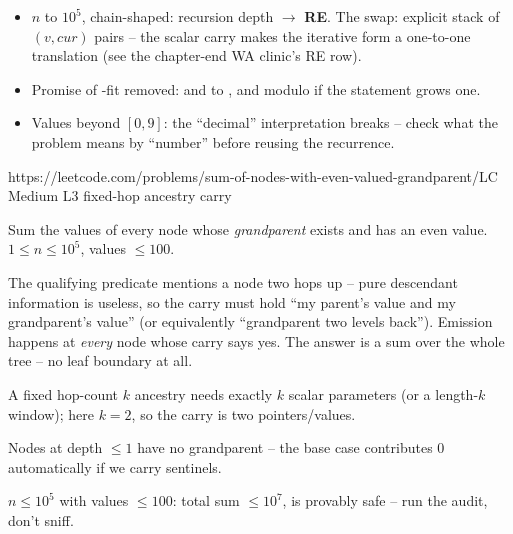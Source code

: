 \begin{hardeningbox}
\begin{itemize}[nosep, leftmargin=1.4em]
  \item $n$ to $10^{5}$, chain-shaped: recursion depth $\to$ \textbf{RE}. The
        swap: explicit stack of $(v, \mathit{cur})$ pairs -- the scalar carry
        makes the iterative form a one-to-one translation (see the chapter-end
        WA clinic's RE row).
  \item Promise of -fit removed:  and  to
        , and modulo if the statement grows one.
  \item Values beyond $[0,9]$: the ``decimal'' interpretation breaks -- check
        what the problem means by ``number'' before reusing the recurrence.
\end{itemize}
\end{hardeningbox}

  {https://leetcode.com/problems/sum-of-nodes-with-even-valued-grandparent/}{LC Medium L3}
  {fixed-hop ancestry carry}

\begin{problemstatement}
Sum the values of every node whose \emph{grandparent} exists and has an even
value. $1 \le n \le 10^{5}$, values $\le 100$.
\end{problemstatement}

The qualifying predicate mentions a node two hops up -- pure descendant
information is useless, so the carry must hold ``my parent's value and my
grandparent's value'' (or equivalently ``grandparent two levels back'').
Emission happens at \emph{every} node whose carry says yes. The answer is a sum
over the whole tree -- no leaf boundary at all.

\begin{observation}
A fixed hop-count $k$ ancestry needs exactly $k$ scalar parameters (or a
length-$k$ window); here $k=2$, so the carry is two pointers/values.
\end{observation}
\begin{observation}
Nodes at depth $\le 1$ have no grandparent -- the base case contributes $0$
automatically if we carry  sentinels.
\end{observation}
\begin{observation}
$n \le 10^{5}$ with values $\le 100$: total sum $\le 10^{7}$,  is
provably safe -- run the audit, don't sniff.
\end{observation}

